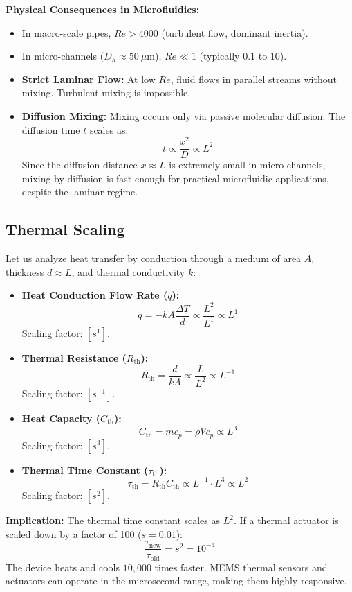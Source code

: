 \documentclass[12pt,a4paper]{article}
\begin{document}
\textbf{Physical Consequences in Microfluidics:}
\begin{itemize}[leftmargin=*, itemsep=2.5pt]
  \item In macro-scale pipes, $Re > 4000$ (turbulent flow, dominant inertia).
  \item In micro-channels ($D_h \approx 50\ \mu\text{m}$), $Re \ll 1$ (typically $0.1$ to $10$).
  \item \textbf{Strict Laminar Flow:} At low $Re$, fluid flows in parallel streams without mixing. Turbulent mixing is impossible.
  \item \textbf{Diffusion Mixing:} Mixing occurs only via passive molecular diffusion. The diffusion time $t$ scales as:
  $$t \propto \frac{x^2}{D} \propto L^2$$
  Since the diffusion distance $x \approx L$ is extremely small in micro-channels, mixing by diffusion is fast enough for practical microfluidic applications, despite the laminar regime.
\end{itemize}

\subsection{Thermal Scaling}
Let us analyze heat transfer by conduction through a medium of area $A$, thickness $d \approx L$, and thermal conductivity $k$:
\begin{itemize}[leftmargin=*, itemsep=3.5pt]
  \item \textbf{Heat Conduction Flow Rate ($q$):}
  $$q = -k A \frac{\Delta T}{d} \propto \frac{L^2}{L^1} \propto L^1$$
  Scaling factor: $[s^1]$.
  \item \textbf{Thermal Resistance ($R_{\text{th}}$):}
  $$R_{\text{th}} = \frac{d}{k A} \propto \frac{L}{L^2} \propto L^{-1}$$
  Scaling factor: $[s^{-1}]$.
  \item \textbf{Heat Capacity ($C_{\text{th}}$):}
  $$C_{\text{th}} = m c_p = \rho V c_p \propto L^3$$
  Scaling factor: $[s^3]$.
  \item \textbf{Thermal Time Constant ($\tau_{\text{th}}$):}
  $$\tau_{\text{th}} = R_{\text{th}} C_{\text{th}} \propto L^{-1} \cdot L^3 \propto L^2$$
  Scaling factor: $[s^2]$.
\end{itemize}

\textbf{Implication:}
The thermal time constant scales as $L^2$. If a thermal actuator is scaled down by a factor of 100 ($s = 0.01$):
$$\frac{\tau_{\text{new}}}{\tau_{\text{old}}} = s^2 = 10^{-4}$$
The device heats and cools $10,000$ times faster. MEMS thermal sensors and actuators can operate in the microsecond range, making them highly responsive.
\end{document}
